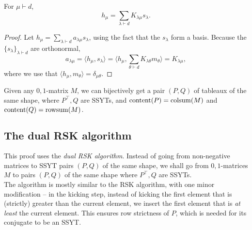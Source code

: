 	\begin{fcor}
		For $\mu \vdash d$,
		\[ h_\mu = \sum_{\lambda \vdash d} K_{\lambda\mu} s_\lambda. \]
	\end{fcor}
	\begin{proof}
		Let $h_\mu = \sum_{\lambda \vdash d} a_{\lambda\mu} s_\lambda$, using the fact that the $s_\lambda$ form a basis. Because the $\{s_\lambda\}_{\lambda \vdash d}$ are orthonormal,
		\[ a_{\lambda\mu} = \langle h_\mu , s_\lambda \rangle = \langle  h_\mu , \sum_{\theta \vdash d} K_{\lambda\theta} m_\theta \rangle = K_{\lambda\mu}, \]
		where we use that $\langle h_\mu,m_\theta\rangle = \delta_{\mu\theta}$.
	\end{proof}

	\begin{ftheo}
		Given any $0,1$-matrix $M$, we can bijectively get a pair $(P,Q)$ of tableaux of the same shape, where $P^\top, Q$ are SSYTs, and $\operatorname{content}(P) = \operatorname{colsum}(M)$ and $\operatorname{content}(Q) = \operatorname{rowsum}(M)$.  
	\end{ftheo}

\subsection{The dual RSK algorithm}

	This proof uses the \emph{dual RSK algorithm}. Instead of going from non-negative matrices to SSYT pairs $(P,Q)$ of the same shape, we shall go from $0,1$-matrices $M$ to pairs $(P,Q)$ of the same shape where $P^\top,Q$ are SSYTs.\\
	The algorithm is mostly similar to the RSK algorithm, with one minor modification -- in the kicking step, instead of kicking the first element that is (strictly) greater than the current element, we insert the first element that is \emph{at least} the current element. This ensures row strictness of $P$, which is needed for its conjugate to be an SSYT.

